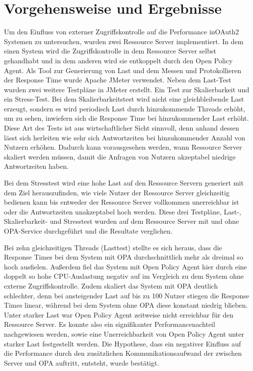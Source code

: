 \section{Vorgehensweise und Ergebnisse}
\label{sec:intro:goal}
Um den Einfluss von externer Zugriffskontrolle auf die Performance in\linebreak OAuth2 Systemen zu untersuchen, wurden zwei Ressource Server implementiert. In dem einen System wird die Zugriffskontrolle in dem Ressource Server selbst gehandhabt und in dem anderen wird sie entkoppelt durch den Open Policy Agent. 
Als Tool zur Generierung von Last und dem Messen und Protokollieren der Response Time wurde Apache JMeter verwendet. Neben dem Last-Test wurden zwei weitere Testpläne in JMeter erstellt. Ein Test zur Skalierbarkeit und ein Stress-Test. Bei dem Skalierbarkeitstest wird nicht eine gleichbleibende Last erzeugt, sondern es wird periodisch Last durch hinzukommende Threads erhöht, um zu sehen, inwiefern sich die Response Time bei hinzukommender Last erhöht. Diese Art des Tests ist aus wirtschaftlicher Sicht sinnvoll, denn anhand dessen lässt sich herleiten wie sehr sich Antwortzeiten bei hinzukommender Anzahl von Nutzern erhöhen. Dadurch kann vorausgesehen werden, wann Ressource Server skaliert werden müssen, damit die Anfragen von Nutzern akzeptabel niedrige Antwortzeiten haben. \smallskip

Bei dem Stresstest wird eine hohe Last auf den Ressource Servern generiert mit dem Ziel herauszufinden, wie viele Nutzer der Ressource Server gleichzeitig bedienen kann bis entweder der Ressource Server vollkommen unerreichbar ist oder die Antwortzeiten unakzeptabel hoch werden. Diese drei Testpläne, Last-, Skalierbarkeit- und Stresstest wurden auf dem Ressource Server mit und ohne OPA-Service durchgeführt und die Resultate verglichen.\smallskip

Bei zehn gleichzeitigen Threads (Lasttest) stellte es sich heraus, dass die Response Times bei dem System mit OPA durchschnittlich mehr als dreimal so hoch ausfielen. Außerdem fiel das System mit Open Policy Agent hier durch eine doppelt so hohe \ac{CPU}-Auslastung negativ auf im Vergleich zu dem System ohne externe Zugriffskontrolle. Zudem skaliert das System mit \ac*{OPA} deutlich schlechter, denn bei ansteigender Last auf bis zu 100 Nutzer stiegen die Response Times linear, während bei dem System ohne OPA diese konstant niedrig blieben. Unter starker Last war Open Policy Agent zeitweise nicht erreichbar für den Ressource Server. Es konnte also ein signifikanter Performancenachteil nachgewiesen werden, sowie eine Unerreichbarkeit von Open Policy Agent unter starker Last festgestellt werden. Die Hypothese, dass ein negativer Einfluss auf die Performance durch den zusätzlichen Kommunikationsaufwand der zwischen Server und \ac*{OPA} auftritt, entsteht, wurde bestätigt.

